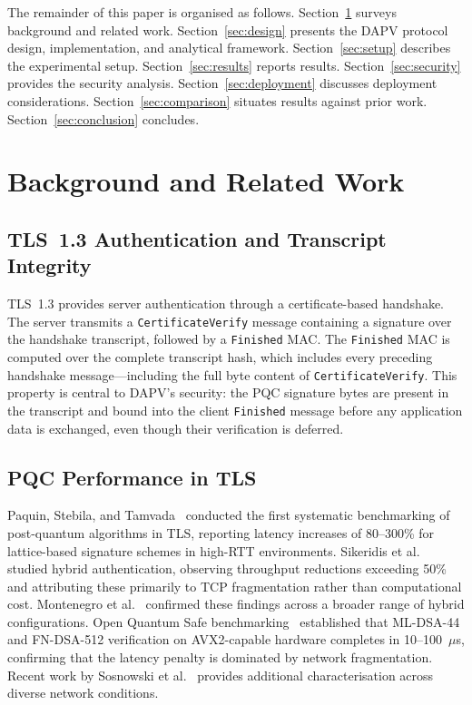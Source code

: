 \documentclass[preprint,10pt,3p]{elsarticle}
\begin{document}
The remainder of this paper is organised as follows.  Section~\ref{sec:related}
surveys background and related work.  Section~\ref{sec:design} presents the
DAPV protocol design, implementation, and analytical framework.
Section~\ref{sec:setup} describes the experimental setup.
Section~\ref{sec:results} reports results.  Section~\ref{sec:security}
provides the security analysis.  Section~\ref{sec:deployment} discusses
deployment considerations.  Section~\ref{sec:comparison} situates results
against prior work.  Section~\ref{sec:conclusion} concludes.

\section{Background and Related Work}
\label{sec:related}

\subsection{TLS~1.3 Authentication and Transcript Integrity}

TLS~1.3 provides server authentication through a certificate-based handshake.
The server transmits a \texttt{CertificateVerify} message containing a
signature over the handshake transcript, followed by a \texttt{Finished} MAC.
The \texttt{Finished} MAC is computed over the complete transcript hash, which
includes every preceding handshake message---including the full byte content
of \texttt{CertificateVerify}.  This property is central to DAPV's security:
the PQC signature bytes are present in the transcript and bound into the client
\texttt{Finished} message before any application data is exchanged, even though
their verification is deferred.

\subsection{PQC Performance in TLS}

Paquin, Stebila, and Tamvada~\cite{Paquin2020} conducted the first systematic
benchmarking of post-quantum algorithms in TLS, reporting latency increases of
80--300\% for lattice-based signature schemes in high-RTT environments.
Sikeridis et al.~\cite{Sikeridis2020a,Sikeridis2020b} studied hybrid
authentication, observing throughput reductions exceeding 50\% and attributing
these primarily to TCP fragmentation rather than computational cost.  Montenegro
et al.~\cite{Montenegro2026} confirmed these findings across a broader range of
hybrid configurations.  Open Quantum Safe benchmarking~\cite{OQS2017}
established that ML-DSA-44 and FN-DSA-512 verification on AVX2-capable
hardware completes in 10--100~$\mu$s, confirming that the latency penalty is
dominated by network fragmentation.  Recent work by Sosnowski et
al.~\cite{Sosnowski2023} provides additional characterisation across diverse
network conditions.
\end{document}
